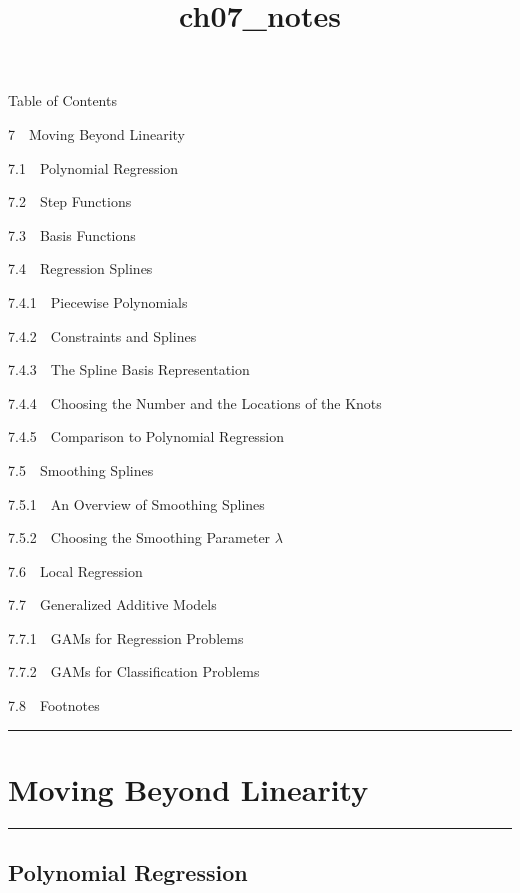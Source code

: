 \documentclass[11pt]{article}
\title{ch07\_notes}
\begin{document}
    
    
    \maketitle
    
    

    
    Table of Contents{}

{{7~~}Moving Beyond Linearity}

{{7.1~~}Polynomial Regression}

{{7.2~~}Step Functions}

{{7.3~~}Basis Functions}

{{7.4~~}Regression Splines}

{{7.4.1~~}Piecewise Polynomials}

{{7.4.2~~}Constraints and Splines}

{{7.4.3~~}The Spline Basis Representation}

{{7.4.4~~}Choosing the Number and the Locations of the Knots}

{{7.4.5~~}Comparison to Polynomial Regression}

{{7.5~~}Smoothing Splines}

{{7.5.1~~}An Overview of Smoothing Splines}

{{7.5.2~~}Choosing the Smoothing Parameter \(\lambda\)}

{{7.6~~}Local Regression}

{{7.7~~}Generalized Additive Models}

{{7.7.1~~}GAMs for Regression Problems}

{{7.7.2~~}GAMs for Classification Problems}

{{7.8~~}Footnotes}

    \begin{center}\rule{0.5\linewidth}{\linethickness}\end{center}

\hypertarget{moving-beyond-linearity}{%
\section{Moving Beyond Linearity}\label{moving-beyond-linearity}}

\begin{center}\rule{0.5\linewidth}{\linethickness}\end{center}

    \hypertarget{polynomial-regression}{%
\subsection{Polynomial Regression}\label{polynomial-regression}}
\end{document}
